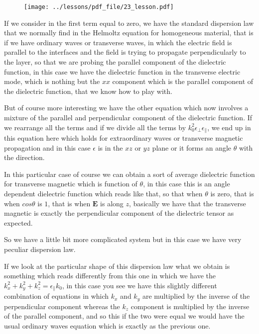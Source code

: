 \documentclass[../main/main.tex]{subfiles}
\begin{document}
\begin{figure}[h!]
\centering
\texttt{[image: ../lessons/pdf\_file/23\_lesson.pdf]}
\end{figure}

If we consider in the first term equal to zero, we have the standard dispersion law that we normally find in the Helmoltz equation for homogeneous material, that is if we have ordinary waves or transverse waves, in which the electric field is parallel to the interfaces and the field is trying to propagate perpendicularly to the layer, so that we are probing the parallel component of the dielectric function, in this case we have the dielectric function in the transverse electric mode, which is nothing but the $xx$ component which is the parallel component of the dielectric function, that we know how to play with.

But of course more interesting we have the other equation which now involves a mixture of the parallel and perpendicular component of the dielectric function. If we rearrange all the terms and if we divide all the terms by $k_0^2 \epsilon_{\perp} \epsilon_{\parallel}$, we end up in this equation here which holds for extraordinary waves or transverse magnetic propagation and in this case $\epsilon$ is in the $xz$ or $yz$ plane or it forms an angle $\theta$ with the  direction.

In this particular case of course we can obtain a sort of average dielectric function for transverse magnetic which is function of $\theta$, in this case this is an angle dependent dielectric function which reads like that, so that when $\theta$ is zero, that is when $cos\theta$ is $1$, that is when $\mathbf{E}$ is along $z$, basically we have that the transverse magnetic is exactly the perpendicular component of the dielectric tensor as  expected.

So we have a little bit more complicated system but in this case we have very peculiar dispersion law.

If we look at the particular shape of this dispersion law what we obtain is something which reads differently from this one in which we have the $k_x^2 + k_y^2 + k_z^2 = \epsilon_{\parallel} k_0$, in this case you see we have this slightly different combination of equations in which $k_x$ and $k_y$ are multiplied by the inverse of the perpendicular component whereas the $k_z$ component is multiplied by the inverse of the parallel component, and so this if the two were equal we would have the usual ordinary waves equation which is exactly as the previous one.
\end{document}
